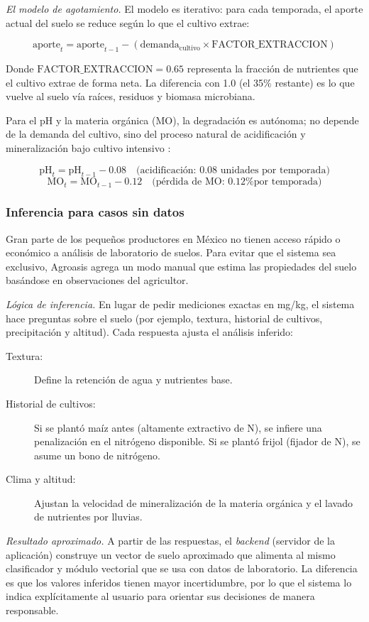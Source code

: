 \documentclass[12pt]{article}
\begin{document}
\noindent\textit{El modelo de agotamiento.} El modelo es iterativo: para cada temporada, el aporte actual del suelo se reduce según lo que el cultivo extrae:

$$\text{aporte}_t = \text{aporte}_{t-1} - (\text{demanda}_{\text{cultivo}} \times \text{FACTOR\_EXTRACCION})$$

Donde $\text{FACTOR\_EXTRACCION} = 0.65$ representa la fracción de nutrientes que el cultivo extrae de forma neta. La diferencia con 1.0 (el 35\% restante) es lo que vuelve al suelo vía raíces, residuos y biomasa microbiana.

Para el pH y la materia orgánica (MO), la degradación es autónoma; no depende de la demanda del cultivo, sino del proceso natural de acidificación y mineralización bajo cultivo intensivo \citep{obalum_2017}:

$$\text{pH}_t = \text{pH}_{t-1} - 0.08 \quad \text{(acidificación: 0.08 unidades por temporada)}$$
$$\text{MO}_t = \text{MO}_{t-1} - 0.12 \quad \text{(pérdida de MO: 0.12\% por temporada)}$$

\subsubsection{Inferencia para casos sin datos}
Gran parte de los pequeños productores en México no tienen acceso rápido o económico a análisis de laboratorio de suelos. Para evitar que el sistema sea exclusivo, Agroasis agrega un modo manual que estima las propiedades del suelo basándose en observaciones del agricultor.

\noindent\textit{Lógica de inferencia.} En lugar de pedir mediciones exactas en mg/kg, el sistema hace preguntas sobre el suelo (por ejemplo, textura, historial de cultivos, precipitación y altitud). Cada respuesta ajusta el análisis inferido:

\begin{description}
    \item[Textura:] Define la retención de agua y nutrientes base.
    \item[Historial de cultivos:] Si se plantó maíz antes (altamente extractivo de N), se infiere una penalización en el nitrógeno disponible. Si se plantó frijol (fijador de N), se asume un bono de nitrógeno.
    \item[Clima y altitud:] Ajustan la velocidad de mineralización de la materia orgánica y el lavado de nutrientes por lluvias.
\end{description}

\noindent\textit{Resultado aproximado.} A partir de las respuestas, el \textit{backend} (servidor de la aplicación) construye un vector de suelo aproximado que alimenta al mismo clasificador y módulo vectorial que se usa con datos de laboratorio. La diferencia es que los valores inferidos tienen mayor incertidumbre, por lo que el sistema lo indica explícitamente al usuario para orientar sus decisiones de manera responsable.
\end{document}
